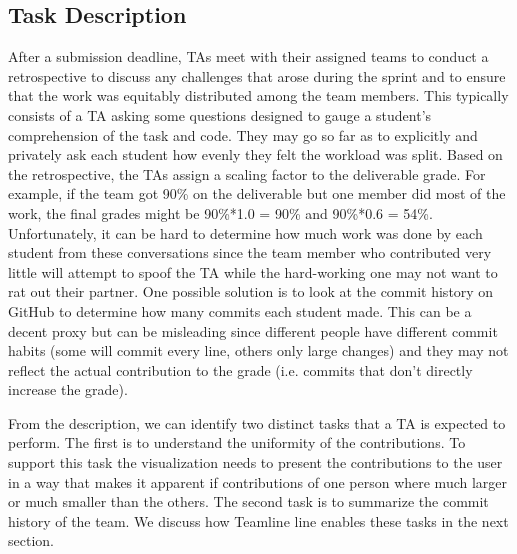 \documentclass[../manifest.tex]{subfiles}
\begin{document}
\subsection{Task Description}
After a submission deadline, TAs meet with their assigned
teams to conduct a retrospective to discuss any challenges that arose
during the sprint and to ensure that the work was equitably distributed among the
team members. This typically consists of a TA asking some questions designed to
gauge a student's comprehension of the task and code. They may go so far as to
explicitly and privately ask each student how evenly they felt the workload was
split. Based on the retrospective, the TAs assign a scaling factor to the deliverable grade. For example, if
the team got 90\% on the deliverable but one member did most of the work, the final
grades might be 90\%*1.0 = 90\% and 90\%*0.6 = 54\%. Unfortunately, it can be hard
to determine how much work was done by each student from these conversations since
the team member who contributed very little will attempt to spoof the TA while the
hard-working one may not want to rat out their partner. One possible solution is
to look at the commit history on GitHub to determine how many commits each student
made. This can be a decent proxy but can be misleading since different people have
different commit habits (some will commit every line, others only large changes)
and they may not reflect the actual contribution to the grade (i.e. commits that
don't directly increase the grade).

From the description, we can identify two distinct tasks that a TA is expected to perform. The first is to understand the uniformity of the contributions. To support this task the visualization needs to present the contributions to the user in a way that makes it apparent if contributions of one person where much larger or much smaller than the others. The second task is to summarize the commit history of the team. We discuss how Teamline line enables these tasks in the next section.
\end{document}
